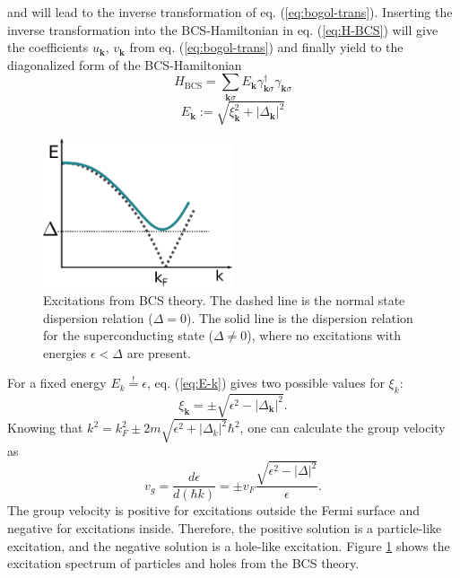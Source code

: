 and will lead to the inverse transformation of eq. (\ref{eq:bogol-trans}). Inserting the inverse transformation into the BCS-Hamiltonian in eq. (\ref{eq:H-BCS}) will give the coefficients $u_{\mathbf{k}}$, $v_{\mathbf{k}}$ from eq. (\ref{eq:bogol-trans}) and finally yield to the diagonalized form of the BCS-Hamiltonian
\begin{equation}
H_{\text{BCS}} =  \sum_{ \mathbf{k} \sigma } E_{ \mathbf{k} } \gamma^{\dagger}_{\mathbf{k} \sigma } \gamma_{\mathbf{k} \sigma }
\end{equation}
\begin{equation}
E_{\mathbf{k}} :=  \sqrt{\xi^2_{\mathbf{k}}  + |\Delta_{\mathbf{k}}|^2 } \label{eq:E-k}
\end{equation}
\begin{figure}
\centering
\includegraphics[width=0.5\textwidth]{figure/framework-analytical/bcs-spectrum_csch}
\caption{Excitations from BCS theory. The dashed line is the normal state dispersion relation ($\Delta = 0$). The solid line is the dispersion relation for the superconducting state ($\Delta \neq 0$), where no excitations with energies $\epsilon < \Delta$ are present. } \label{fig:bcs-spectrum}
\end{figure}
For a fixed energy $E_k \stackrel{!}{=} \epsilon $, eq. (\ref{eq:E-k}) gives two possible values for $\xi_k$:
\begin{equation}
\xi_\mathbf{k} = \pm \sqrt{\epsilon^2 - | \Delta_\mathbf{k}|^2}.
\end{equation}
Knowing that $k^2 = k_F^2 \pm 2m\sqrt{\epsilon^2 + |\Delta_k|^2} \hbar^2$, one can calculate the group velocity as 
\begin{equation}
v_g = \frac{d \epsilon}{d (\hbar k)} = \pm v_F \frac{\sqrt{\epsilon^2 - |\Delta|^2}}{\epsilon}.
\end{equation}
The group velocity is positive for excitations outside the Fermi surface and negative for excitations inside. Therefore, the positive solution is a particle-like excitation, and the negative solution is a hole-like excitation. Figure \ref{fig:bcs-spectrum} shows the excitation spectrum of particles and holes from the BCS theory. 

